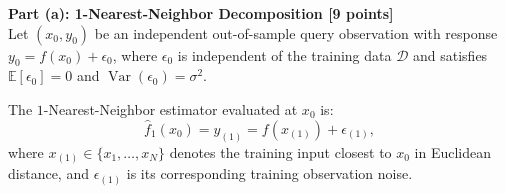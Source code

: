 \documentclass[11pt,a4paper]{article}
\begin{document}
\vspace{8pt}
\noindent{\large\bfseries\textcolor{utblue}{Solution:}}
\vspace{4pt}

\textbf{Part (a): 1-Nearest-Neighbor Decomposition [9 points]} \\
Let $(x_0, y_0)$ be an independent out-of-sample query observation with response $y_0 = f(x_0) + \epsilon_0$, where $\epsilon_0$ is independent of the training data $\mathcal{D}$ and satisfies $\mathbb{E}[\epsilon_0] = 0$ and $\operatorname{Var}(\epsilon_0) = \sigma^2$.

The $1$-Nearest-Neighbor estimator evaluated at $x_0$ is:
\[
  \hat{f}_1(x_0) = y_{(1)} = f(x_{(1)}) + \epsilon_{(1)},
\]
where $x_{(1)} \in \{x_1, \dots, x_N\}$ denotes the training input closest to $x_0$ in Euclidean distance, and $\epsilon_{(1)}$ is its corresponding training observation noise.
\end{document}
